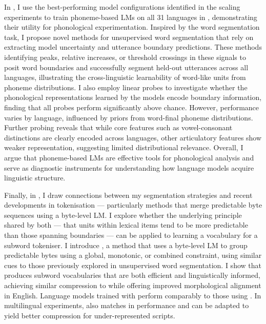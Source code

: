 In , I use the best-performing model configurations identified in the scaling experiments to train phoneme-based LMs on all 31 languages in \ipachildes, demonstrating their utility for phonological experimentation. Inspired by the word segmentation task, I propose novel methods for unsupervised word segmentation that rely on extracting model uncertainty and utterance boundary predictions. These methods identifying peaks, relative increases, or threshold crossings in these signals to posit word boundaries and successfully segment held-out utterances across all  languages, illustrating the cross-linguistic learnability of word-like units from phoneme distributions. I also employ linear probes to investigate whether the phonological representations learned by the models encode boundary information, finding that all probes perform significantly above chance. However, performance varies by language, influenced by priors from word-final phoneme distributions. Further probing reveals that while core features such as vowel-consonant distinctions are clearly encoded across  languages, other articulatory features show weaker representation, suggesting limited distributional relevance. Overall, I argue that phoneme-based LMs are effective tools for phonological analysis and serve as diagnostic instruments for understanding how language models acquire linguistic structure.

Finally, in , I draw connections between my segmentation strategies and recent developments in tokenisation --- particularly methods that merge predictable byte sequences using a byte-level LM. I explore whether the underlying principle shared by both --- that units within lexical items tend to be more predictable than those spanning boundaries --- can be applied to learning a vocabulary for a subword tokeniser. I introduce \bytespan, a method that uses a byte-level LM to group predictable bytes using a global, monotonic, or combined constraint, using similar cues to those previously explored in unsupervised word segmentation. I show that \bytespan produces subword vocabularies that are both efficient and linguistically informed, achieving similar compression to \bpe while offering improved morphological alignment in English. Language models trained with \bytespan perform comparably to those using \bpe. In multilingual experiments, \bytespan also matches \bpe in performance and can be adapted to yield better compression for under-represented scripts.

